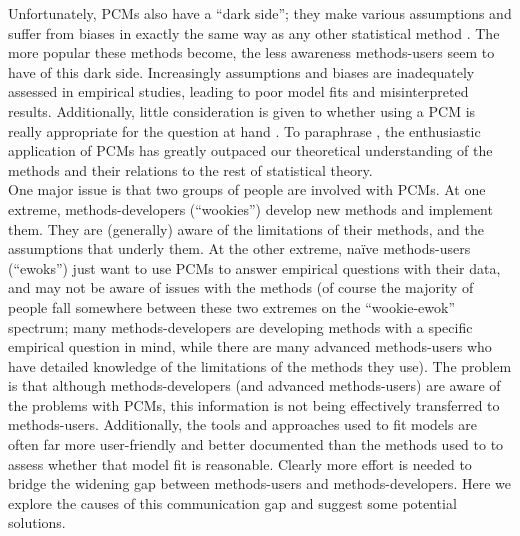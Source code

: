\documentclass[a4paper,12pt]{article}
\begin{document}
Unfortunately, PCMs also have a ``dark side''; they make various assumptions and suffer from biases in exactly the same way as any other statistical method \citep{freckleton2009seven,boettiger2012your}. 
The more popular these methods become, the less awareness methods-users seem to have of this dark side. Increasingly assumptions and biases are inadequately assessed in empirical studies, leading to poor model fits and misinterpreted results. 
Additionally, little consideration is given to whether using a PCM is really appropriate for the question at hand \citep{losos2011seeing}. 
To paraphrase \citet{blomberg2012independent}, the enthusiastic application of PCMs has greatly outpaced our theoretical understanding of the methods and their relations to the rest of statistical theory.\\


One major issue is that two groups of people are involved with PCMs. 
At one extreme, methods-developers (``wookies'') develop new methods and implement them. They are (generally) aware of the limitations of their methods, and the assumptions that underly them. 
At the other extreme, na\"{i}ve methods-users (``ewoks'') just want to use PCMs to answer empirical questions with their data, and may not be aware of issues with the methods 
(of course the majority of people fall somewhere between these two extremes on the ``wookie-ewok'' spectrum; many methods-developers are developing methods with a specific empirical question in mind, while there are many advanced methods-users who have detailed knowledge of the limitations of the methods they use). 
The problem is that although methods-developers (and advanced methods-users) are aware of the problems with PCMs, this information is not being effectively transferred to methods-users. 
Additionally, the tools and approaches used to fit models are often far more user-friendly and better documented than the methods used to to assess whether that model fit is reasonable. 
Clearly more effort is needed to bridge the widening gap between methods-users and methods-developers. Here we explore the causes of this communication gap and suggest some potential solutions. %
\end{document}

